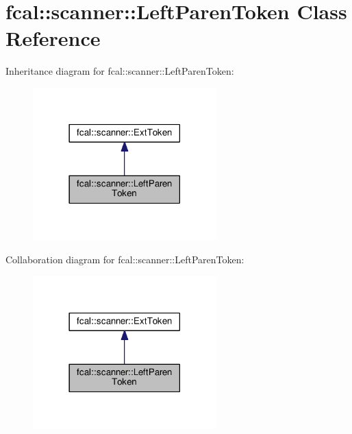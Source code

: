 \hypertarget{classfcal_1_1scanner_1_1LeftParenToken}{}\section{fcal\+:\+:scanner\+:\+:Left\+Paren\+Token Class Reference}
\label{classfcal_1_1scanner_1_1LeftParenToken}


Inheritance diagram for fcal\+:\+:scanner\+:\+:Left\+Paren\+Token\+:\nopagebreak
\begin{figure}[H]
\begin{center}
\leavevmode
\includegraphics[width=201pt]{classfcal_1_1scanner_1_1LeftParenToken__inherit__graph}
\end{center}
\end{figure}


Collaboration diagram for fcal\+:\+:scanner\+:\+:Left\+Paren\+Token\+:\nopagebreak
\begin{figure}[H]
\begin{center}
\leavevmode
\includegraphics[width=201pt]{classfcal_1_1scanner_1_1LeftParenToken__coll__graph}
\end{center}
\end{figure}
